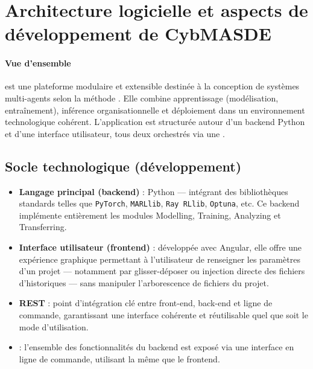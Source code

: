 \section*{Architecture logicielle et aspects de développement de CybMASDE}

\paragraph{Vue d’ensemble}
\footnotemark[1] est une plateforme modulaire et extensible destinée à la conception de systèmes multi-agents selon la méthode . Elle combine apprentissage (modélisation, entraînement), inférence organisationnelle et déploiement dans un environnement technologique cohérent. L'application est structurée autour d'un backend Python et d'une interface utilisateur, tous deux orchestrés via une  .



\subsection*{Socle technologique (développement)}

\begin{itemize}
    \item \textbf{Langage principal (backend)} : Python — intégrant des bibliothèques standards telles que \texttt{PyTorch}, \texttt{MARLlib}, \texttt{Ray RLlib}, \texttt{Optuna}, etc. Ce backend implémente entièrement les modules Modelling, Training, Analyzing et Transferring.
    \item \textbf{Interface utilisateur (frontend)} : développée avec Angular, elle offre une expérience graphique permettant à l’utilisateur de renseigner les paramètres d’un projet — notamment par glisser-déposer ou injection directe des fichiers d’historiques — sans manipuler l’arborescence de fichiers du projet.
    \item \textbf{ REST} : point d’intégration clé entre front-end, back-end et ligne de commande, garantissant une interface cohérente et réutilisable quel que soit le mode d’utilisation.
    \item \textbf{} : l’ensemble des fonctionnalités du backend est exposé via une interface en ligne de commande, utilisant la même   que le frontend.
\end{itemize}

